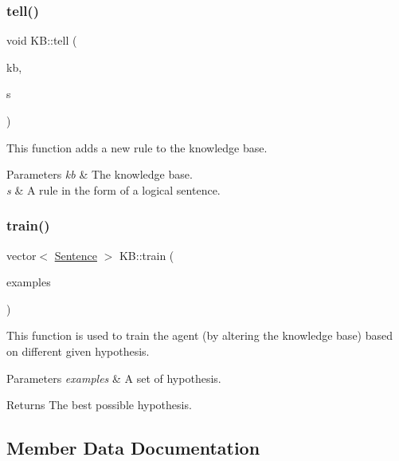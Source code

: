 \subsubsection{\texorpdfstring{tell()}{tell()}}
{\footnotesize\ttfamily void K\+B\+::tell (\begin{DoxyParamCaption}\item[{\mbox{\hyperlink{classKB}{KB}}}]{kb,  }\item[{vector$<$ \mbox{\hyperlink{classSentence}{Sentence}} $>$}]{s }\end{DoxyParamCaption})}



This function adds a new rule to the knowledge base. 


\begin{DoxyParams}{Parameters}
{\em kb} & The knowledge base. \\
\hline
{\em s} & A rule in the form of a logical sentence. \\
\hline
\end{DoxyParams}
\mbox{\label{classKB_abbd192b58b489d5123d844b11e1b6355}} 
\subsubsection{\texorpdfstring{train()}{train()}}
{\footnotesize\ttfamily vector$<$ \mbox{\hyperlink{classSentence}{Sentence}} $>$ K\+B\+::train (\begin{DoxyParamCaption}\item[{vector$<$ vector$<$ \mbox{\hyperlink{classSentence}{Sentence}} $>$$>$}]{examples }\end{DoxyParamCaption})}



This function is used to train the agent (by altering the knowledge base) based on different given hypothesis. 


\begin{DoxyParams}{Parameters}
{\em examples} & A set of hypothesis. \\
\hline
\end{DoxyParams}
\begin{DoxyReturn}{Returns}
The best possible hypothesis. 
\end{DoxyReturn}


\subsection{Member Data Documentation}
\mbox{\label{classKB_ac8dc8b51b72a89ba4c88bbc93c40b948}} 
